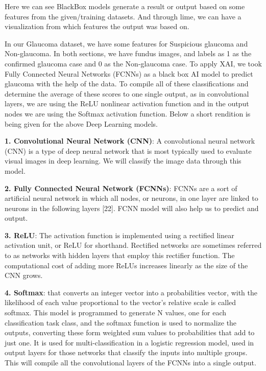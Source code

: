 \vspace{5mm}
\noindent Here we can see BlackBox models generate a result or output based on some features from the given/training datasets. And through lime, we can have a visualization from which features the output was based on.

\vspace{5mm}
\noindent In our Glaucoma dataset, we have some features for Suspicious glaucoma and Non-glaucoma. In both sections, we have fundus images, and labels as 1 as the confirmed glaucoma case and 0 as the Non-glaucoma case. To apply XAI, we took Fully Connected Neural Networks (FCNNs) as a black box AI model to predict glaucoma with the help of the data. To compile all of these classifications and determine the average of these scores to one single output, as in convolutional layers, we are using the ReLU nonlinear activation function and in the output nodes we are using the Softmax activation function. Below a short rendition is being given for the above Deep Learning models.

\vspace{5mm}
\noindent \textbf{1. Convolutional Neural Network (CNN)}: A convolutional neural network (CNN) is a type of deep neural network that is most typically used to evaluate visual images in deep learning. We will classify the image data through this model.

\vspace{5mm}
\noindent \textbf{2. Fully Connected Neural Network (FCNNs)}: FCNNs are a sort of artificial neural network in which all nodes, or neurons, in one layer are linked to neurons in the following layers [22]. FCNN model will also help us to predict and output.

\vspace{5mm}
\noindent \textbf{3. ReLU}: The activation function is implemented using a rectified linear activation unit, or ReLU for shorthand. Rectified networks are sometimes referred to as networks with hidden layers that employ this rectifier function. The computational cost of adding more ReLUs increases linearly as the size of the CNN grows.

\vspace{5mm}
\noindent \textbf{4. Softmax}:  that converts an integer vector into a probabilities vector, with the likelihood of each value proportional to the vector's relative scale is called softmax.  This model is programmed to generate N values, one for each classification task class, and the softmax function is used to normalize the outputs, converting these form weighted sum values to probabilities that add to just one. It is used for multi-classification in a logistic regression model, used in output layers for those networks that classify the inputs into multiple groups. This will compile all the convolutional layers of the FCNNs into a single output.

